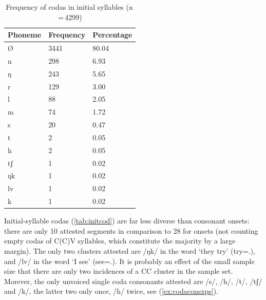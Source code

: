 \begin{table}\centering
\caption[Frequency of codas in initial syllables]{Frequency of codas in initial
syllables (n\,=\,4299)}
\begin{tabu} to 0.67\linewidth{X X[c] X[c]}
\tableheaderfont\toprule
Phoneme
	& Frequency
	& Percentage
	\\
	
\toprule

Ø
	& 3441
	& 80.04\pct
	\\

\midrule

n
	& 298
	& 6.93\pct
	\\

ŋ
	& 243
	& 5.65\pct
	\\

r
	& 129
	& 3.00\pct
	\\

l
	& 88
	& 2.05\pct
	\\

m
	& 74
	& 1.72\pct
	\\

s
	& 20
	& 0.47\pct
	\\

t
	& 2
	& 0.05\pct
	\\

h
	& 2
	& 0.05\pct
	\\
	
tʃ
	& 1
	& 0.02\pct
	\\

ŋk
	& 1
	& 0.02\pct
	\\

lv
	& 1
	& 0.02\pct
	\\

k
	& 1
	& 0.02\pct
	\\

\bottomrule
\end{tabu}
\label{tab:initcod}
\end{table}

Initial-syllable codas (\autoref{tab:initcod}) are far less diverse than
consonant onsets: there are only 10 attested segments in comparison to 28 for
onsets (not counting empty codas of C(C)V syllables, which constitute the
majority by a large margin). The only two clusters attested are /ŋk/ in the
word  `they try' (try=\TplM{}.\Aarg{}), and /lv/ in
the word  `I see' (see=\Fpl{}.\Aarg{}). It is
probably an effect of the small sample size that there are only two incidences
of a CC cluster in the sample set. Morever, the only unvoiced single coda
consonants attested are /s/, /h/, /t/, /tʃ/ and /k/, the latter two only once,
/h/ twice, see (\ref{ex:codaconsxps}).

